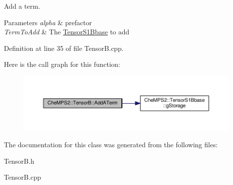Add a term. 


\begin{DoxyParams}{Parameters}
{\em alpha} & prefactor \\
\hline
{\em Term\-To\-Add} & The \hyperlink{classCheMPS2_1_1TensorS1Bbase}{Tensor\-S1\-Bbase} to add \\
\hline
\end{DoxyParams}


Definition at line 35 of file Tensor\-B.\-cpp.



Here is the call graph for this function\-:\nopagebreak
\begin{figure}[H]
\begin{center}
\leavevmode
\includegraphics[width=350pt]{classCheMPS2_1_1TensorB_a5d55f80f8053d96b413542db4a3d9b9a_cgraph}
\end{center}
\end{figure}




The documentation for this class was generated from the following files\-:\begin{DoxyCompactItemize}
\item 
Tensor\-B.\-h\item 
Tensor\-B.\-cpp\end{DoxyCompactItemize}
